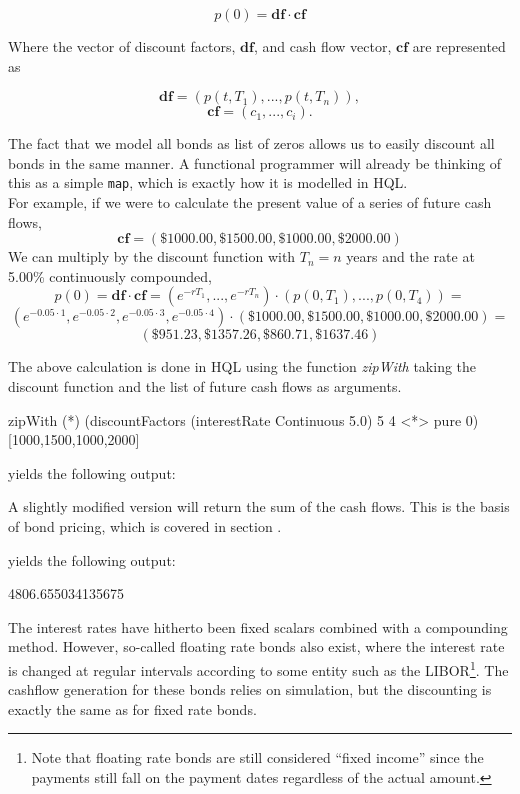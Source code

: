\[
p(0) = \mathbf{df}\cdot\mathbf{cf}
\]

Where the vector of discount factors, $\mathbf{df}$, and cash flow vector, $\mathbf{cf}$ are represented as

\[
\mathbf{df} = (p(t,T_1), ..., p(t,T_n)),
\]
\[
\mathbf{cf} = (c_1, ..., c_i).
\]

The fact that we model all bonds as list of zeros allows us to easily discount 
all bonds in the same manner. A functional programmer will already be thinking 
of this as a simple \texttt{map}, which is exactly how it is modelled in HQL.\\

For example, if we were to calculate the present value of a series of future cash flows,
	\[
	\mathbf{cf} = (\$1000.00,\$1500.00,\$1000.00,\$2000.00)
	\]
	We can multiply by the discount function with $T_n=n$ years and the rate at 5.00\% continuously compounded,
	\[
	p(0) = \mathbf{df}\cdot\mathbf{cf} = (e^{-rT_1},...,e^{-rT_n})\cdot(p(0,T_1), ...,p(0,T_4))=
	\]
	\[
	(e^{-0.05\cdot1},e^{-0.05\cdot2},e^{-0.05\cdot3},e^{-0.05\cdot4}) \cdot (\$1000.00,\$1500.00,\$1000.00,\$2000.00)=
	\]
	\[
	(\$951.23,\$1357.26,\$860.71,\$1637.46)
	\]

	The above calculation is done in HQL using the function \textit{zipWith} taking the discount function and the list of future cash flows as arguments.
	\FrameSep
	\begin{listing}
	zipWith (*) (discountFactors (interestRate Continuous 5.0) 5 4 <*> pure 0) [1000,1500,1000,2000]
	\end{listing}
	\FrameSep
	yields the following output:
	\FrameSep
	\begin{listing}[style=Output]
	[951.229424500714,1357.2561270539393,860.7079764250578,1637.4615061559637]
	\end{listing}
	\FrameSep
	A slightly modified version will return the sum of the cash flows. This is the basis of bond pricing, which is covered in section .
	\FrameSep
	\FrameSep
	yields the following output:
	\FrameSep
	\begin{listing}[style=Output]
	4806.655034135675
	\end{listing}

The interest rates have hitherto been fixed scalars combined with a compounding 
method. However, so-called floating rate bonds also exist, where the interest 
rate is changed at regular intervals according to some entity such as the 
LIBOR\footnote{Note that floating rate bonds are still considered “fixed 
income” since the payments still fall on the payment dates regardless of the 
actual amount.}. The cashflow generation for these bonds relies on simulation, 
but the discounting is exactly the same as for fixed rate bonds.\\


